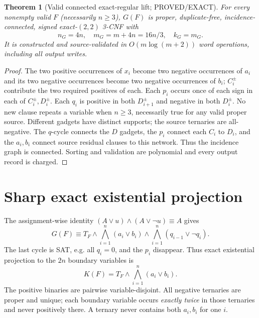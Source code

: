 \documentclass[11pt]{article}
\newtheorem{theorem}{Theorem}
\begin{document}
\begin{theorem}[Valid connected exact-regular lift; PROVED/EXACT]
For every nonempty valid $F$ (necessarily $n\ge3$), $G(F)$ is proper, duplicate-free, incidence-connected, signed exact-$(2,2)$ 3-CNF with
\[
n_G=4n,\quad m_G=m+4n=16n/3,\quad k_G=m_G.
\]
It is constructed and source-validated in $O(m\log(m+2))$ word operations, including all output writes.
\end{theorem}
\begin{proof}
The two positive occurrences of $x_i$ become two negative occurrences of $a_i$ and its two negative occurrences become two negative occurrences of $b_i$; $C_i^\pm$ contribute the two required positives of each. Each $p_i$ occurs once of each sign in each of $C_i^\pm,D_i^\pm$. Each $q_i$ is positive in both $D_{i+1}^\pm$ and negative in both $D_i^\pm$. No new clause repeats a variable when $n\ge3$, necessarily true for any valid proper source. Different gadgets have distinct supports; the source ternaries are all-negative. The $q$-cycle connects the $D$ gadgets, the $p_i$ connect each $C_i$ to $D_i$, and the $a_i,b_i$ connect source residual clauses to this network. Thus the incidence graph is connected. Sorting and validation are polynomial and every output record is charged.
\end{proof}

\section{Sharp exact existential projection}
The assignment-wise identity $(A\vee u)\land(A\vee\neg u)\equiv A$ gives
\[
G(F)\equiv T_F\land
\bigwedge_{i=1}^n(a_i\vee b_i)\land
\bigwedge_{i=1}^n(q_{i-1}\vee\neg q_i).\tag{2}
\]
The last cycle is SAT, e.g. all $q_i=0$, and the $p_i$ disappear. Thus exact existential projection to the $2n$ boundary variables is
\[
K(F)=T_F\land\bigwedge_{i=1}^n(a_i\vee b_i). \tag{3}
\]
The positive binaries are pairwise variable-disjoint. All negative ternaries are proper and unique; each boundary variable occurs \emph{exactly twice} in those ternaries and never positively there. A ternary never contains both $a_i,b_i$ for one $i$.
\end{document}
